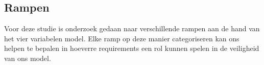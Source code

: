 \documentclass{article}
\begin{document}
	
	
	\subsection{Rampen}
	
	\newline \indent Voor deze studie is onderzoek gedaan naar verschillende rampen aan de hand van het vier variabelen model.
	Elke ramp op deze manier categoriseren  kan ons helpen te bepalen in hoeverre requirements een rol kunnen spelen in de veiligheid van ons model.
	
	
	
\end{document}
